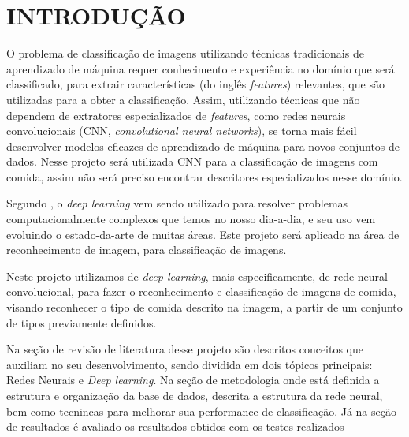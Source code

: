 
\chapter{INTRODUÇÃO}
\label{chap:introducao}
O problema de classificação de imagens utilizando técnicas tradicionais de aprendizado de máquina requer conhecimento e experiência no domínio que será classificado, para extrair características (do inglês \textit{features}) relevantes, que são utilizadas para a obter a classificação. Assim, utilizando técnicas que não dependem de extratores especializados de \textit{features}, como redes neurais convolucionais (CNN, \textit{convolutional neural networks}), se torna mais fácil desenvolver modelos eficazes de aprendizado de máquina para novos conjuntos de dados. Nesse projeto será utilizada CNN para a classificação de imagens com comida, assim não será preciso encontrar descritores especializados nesse domínio. 
\par Segundo \cite{lecun2015deep}, o \textit{deep learning} vem sendo utilizado para resolver problemas computacionalmente complexos que temos no nosso dia-a-dia, e seu uso vem evoluindo o estado-da-arte de muitas áreas. Este projeto será aplicado na área de reconhecimento de imagem, para classificação de imagens.
\par Neste projeto utilizamos de \textit{deep learning}, mais especificamente, de rede neural convolucional, para fazer o reconhecimento e classificação de imagens de comida, visando reconhecer o tipo de comida descrito na imagem, a partir de um conjunto de tipos previamente definidos.
\par Na seção de revisão de literatura desse projeto são descritos conceitos que auxiliam no seu desenvolvimento, sendo dividida em dois tópicos principais: Redes Neurais e \textit{Deep learning}. Na seção de metodologia onde está definida a estrutura e organização da base de dados, descrita a estrutura da rede neural, bem como tecnincas para melhorar sua performance de classificação. Já na seção de resultados é avaliado os resultados obtidos com os testes realizados


